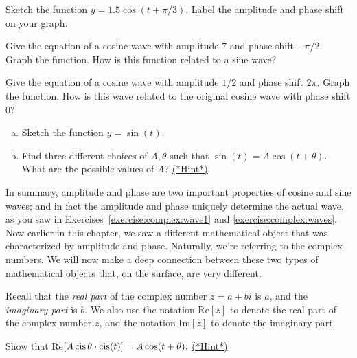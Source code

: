 \begin{exercise}\label{exercise:complex:41}
Sketch the function $y = 1.5 \cos(t + \pi/3)$. Label the amplitude and phase shift on your graph.
\end{exercise}

\begin{exercise}\label{exercise:complex:wave1}
Give the equation of a cosine wave with amplitude 7 and phase shift $-\pi$/2. Graph the function. How is this function related to a sine wave?
\end{exercise}

\begin{exercise}\label{exercise:complex:waves}
Give the equation of a cosine wave with amplitude $1/2$ and phase shift $2\pi$. Graph the function. How is this wave related to the original cosine wave with phase shift 0?
\end{exercise}

\begin{exercise}\label{exercise:complex:42}
\begin{enumerate}[(a)]
\item
Sketch the function $y = \sin(t)$.
\item
Find three different  choices of $A,\theta$ such that 
$ \sin(t) = A  \cos (t + \theta)$.  What are the possible values of $A$?
\hyperref[sec:complex:hints]{(*Hint*)}

\end{enumerate}
\end{exercise}

\noindent
In summary, amplitude and phase are two important properties of cosine and sine waves; and in fact the amplitude and phase uniquely determine the actual wave, as you saw in Exercises~\ref{exercise:complex:wave1} and \ref{exercise:complex:waves}. Now earlier in this chapter, we saw a different mathematical object that was characterized by amplitude and phase. Naturally, we're referring to the complex numbers.  We will now make a deep connection between these two types of mathematical objects that, on the surface, are very different.

Recall that the \emph{real part} of the complex number $z = a + bi$ is $a$, and the \emph{imaginary part} is $b$. We also use the notation Re$[z]$ to denote the real part of the complex number $z$, and the notation Im$[z]$ to denote the imaginary part.

\begin{exercise}\label{exercise:complex:43}
Show that Re$ [A  \operatorname{cis}\theta \cdot \operatorname{cis}( t)]  = A  \cos ( t +  \theta). $
\hyperref[sec:complex:hints]{(*Hint*)}
 \end{exercise}

